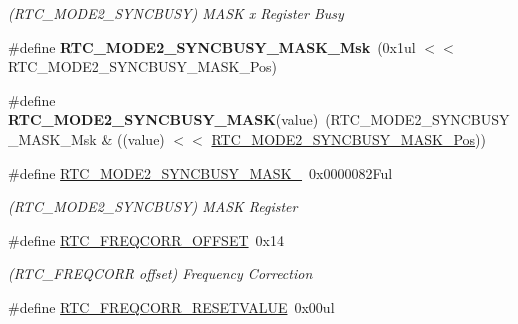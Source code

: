 \begin{DoxyCompactItemize}
\begin{DoxyCompactList}\small\item\em (R\+T\+C\+\_\+\+M\+O\+D\+E2\+\_\+\+S\+Y\+N\+C\+B\+U\+S\+Y) M\+A\+S\+K x Register Busy \end{DoxyCompactList}\item 
\hypertarget{group___s_a_m_l21___r_t_c_gac27e1652be4f09655b690918311df4dd}{}\#define {\bfseries R\+T\+C\+\_\+\+M\+O\+D\+E2\+\_\+\+S\+Y\+N\+C\+B\+U\+S\+Y\+\_\+\+M\+A\+S\+K\+\_\+\+Msk}~(0x1ul $<$$<$ R\+T\+C\+\_\+\+M\+O\+D\+E2\+\_\+\+S\+Y\+N\+C\+B\+U\+S\+Y\+\_\+\+M\+A\+S\+K\+\_\+\+Pos)\label{group___s_a_m_l21___r_t_c_gac27e1652be4f09655b690918311df4dd}

\item 
\hypertarget{group___s_a_m_l21___r_t_c_gac00b98ccefba4dfd2686540d3b474fd2}{}\#define {\bfseries R\+T\+C\+\_\+\+M\+O\+D\+E2\+\_\+\+S\+Y\+N\+C\+B\+U\+S\+Y\+\_\+\+M\+A\+S\+K}(value)~(R\+T\+C\+\_\+\+M\+O\+D\+E2\+\_\+\+S\+Y\+N\+C\+B\+U\+S\+Y\+\_\+\+M\+A\+S\+K\+\_\+\+Msk \& ((value) $<$$<$ \hyperlink{group___s_a_m_l21___r_t_c_ga30fef42c493c6bfa74c767dd98de3b50}{R\+T\+C\+\_\+\+M\+O\+D\+E2\+\_\+\+S\+Y\+N\+C\+B\+U\+S\+Y\+\_\+\+M\+A\+S\+K\+\_\+\+Pos}))\label{group___s_a_m_l21___r_t_c_gac00b98ccefba4dfd2686540d3b474fd2}

\item 
\hypertarget{group___s_a_m_l21___r_t_c_ga7d4d47ec9b8fc9f333da995b82760575}{}\#define \hyperlink{group___s_a_m_l21___r_t_c_ga7d4d47ec9b8fc9f333da995b82760575}{R\+T\+C\+\_\+\+M\+O\+D\+E2\+\_\+\+S\+Y\+N\+C\+B\+U\+S\+Y\+\_\+\+M\+A\+S\+K\+\_\+}~0x0000082\+Ful\label{group___s_a_m_l21___r_t_c_ga7d4d47ec9b8fc9f333da995b82760575}

\begin{DoxyCompactList}\small\item\em (R\+T\+C\+\_\+\+M\+O\+D\+E2\+\_\+\+S\+Y\+N\+C\+B\+U\+S\+Y) M\+A\+S\+K Register \end{DoxyCompactList}\item 
\hypertarget{group___s_a_m_l21___r_t_c_ga0966b5e98353c73d4fb5c30b6565c038}{}\#define \hyperlink{group___s_a_m_l21___r_t_c_ga0966b5e98353c73d4fb5c30b6565c038}{R\+T\+C\+\_\+\+F\+R\+E\+Q\+C\+O\+R\+R\+\_\+\+O\+F\+F\+S\+E\+T}~0x14\label{group___s_a_m_l21___r_t_c_ga0966b5e98353c73d4fb5c30b6565c038}

\begin{DoxyCompactList}\small\item\em (R\+T\+C\+\_\+\+F\+R\+E\+Q\+C\+O\+R\+R offset) Frequency Correction \end{DoxyCompactList}\item 
\hypertarget{group___s_a_m_l21___r_t_c_ga7fa6451c14b5d4a8e022f0ea868b22f4}{}\#define \hyperlink{group___s_a_m_l21___r_t_c_ga7fa6451c14b5d4a8e022f0ea868b22f4}{R\+T\+C\+\_\+\+F\+R\+E\+Q\+C\+O\+R\+R\+\_\+\+R\+E\+S\+E\+T\+V\+A\+L\+U\+E}~0x00ul\label{group___s_a_m_l21___r_t_c_ga7fa6451c14b5d4a8e022f0ea868b22f4}


\end{DoxyCompactItemize}
